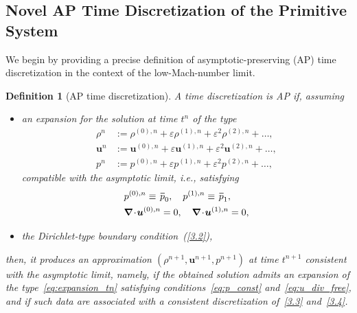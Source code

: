 \documentclass[A4paper,12pt,twoside]{article}
\newtheorem{definition}{Definition}[section]
\numberwithin{equation}{section}
\numberwithin{figure}{section}
\numberwithin{table}{section}
\def\bnabla{\bm{\nabla}}
\newcommand{\ve}{\varepsilon}
\newcommand\eref[1]{(\ref{#1})}
\newcommand*\xbar[1]{%
  \hbox{%
    \vbox{%
      \hrule height 0.5pt %
      \kern0.4ex%
      \hbox{%
        \kern-0.05em%
        \ensuremath{#1}%
        \kern-0.00em%
      }%
    }%
  }%
}
\newcommand{\lore}[1]{{\leavevmode\color{red} #1}}
\begin{document}
\subsection{Novel AP Time Discretization of the Primitive System}\label{sec411}
We begin by providing a precise definition of %
\lore{asymptotic-preserving (AP) time discretization in the context of
the low-Mach-number limit.}
\begin{definition}[AP time discretization]\label{def41}
	\lore{A time discretization is AP if, assuming}
	\begin{itemize}
		\item \lore{an expansion for the solution at time $t^n$ of the type}
		\begin{equation}\label{eq:expansion_tn}
			\begin{aligned}
				\rho^n &:= \rho^{(0),n} + \varepsilon \rho^{(1),n}
					+ \varepsilon^2 \rho^{(2),n} + \dots, \\
				\bm u^n &:= \bm u^{(0),n} + \varepsilon \bm u^{(1),n}
					+ \varepsilon^2 \bm u^{(2),n} + \dots, \\
				p^n &:= p^{(0),n} + \varepsilon p^{(1),n}
					+ \varepsilon^2 p^{(2),n} + \dots,
			\end{aligned}
		\end{equation}
		\lore{compatible with the asymptotic limit, i.e., satisfying}
		\begin{align}
			&p^{(0),n}\equiv\,\xbar p_0,\quad p^{(1),n}\equiv\,\xbar p_1,\label{eq:p_const}\\
			&\bnabla\!\cdot\!\bm u^{(0),n}=0,\quad \bnabla\!\cdot\!\bm u^{(1),n}=0,\label{eq:u_div_free}
		\end{align}
		\item 	\lore{the Dirichlet-type boundary condition~\eref{3.2}},
		\end{itemize}	
		\lore{then, it produces an approximation $(\rho^{n+1},\bm u^{n+1},p^{n+1})$ at time $t^{n+1}$ consistent with the asymptotic limit, namely, if the obtained solution admits an expansion of the type~\eqref{eq:expansion_tn} satisfying conditions~\eqref{eq:p_const} and~\eqref{eq:u_div_free}, and if such data are associated with a consistent discretization of~\eqref{3.3} and~\eqref{3.4}.}

\end{definition}
\end{document}

